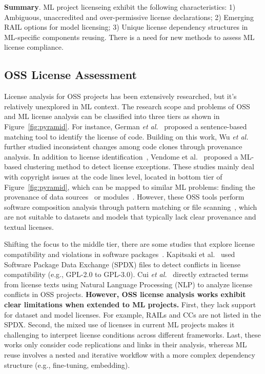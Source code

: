 \begin{tcolorbox}
\textbf{Summary}.
ML project licenseing exhibit the following characteristics:
1) Ambiguous, unaccredited and over-permissive license declarations;
2) Emerging RAIL options for model licensing;
3) Unique license dependency structures in ML-specific components reusing.
There is a need for new methods to assess ML license compliance.
\end{tcolorbox}



\subsection{OSS License Assessment}
License analysis for OSS projects has been extensively researched, but it's relatively unexplored in ML context.
The research scope and problems of OSS and ML license analysis can be classified into three tiers as shown in Figure~\ref{fig:pyramid}.
For instance, German \textit{et al.}~\cite{german2010sentence} proposed a sentence-based matching tool to identify the license of code.
Building on this work, Wu \textit{et al.}~\cite{wu2017analysis} further studied inconsistent changes among code clones through provenance analysis.
In addition to license identification~\cite{jaeger2017fossology}, Vendome et al.~\cite{vendome2017machine} proposed a ML-based clustering method to detect license exceptions.
These studies mainly deal with copyright issues at the code lines level, located in bottom tier of Figure~\ref{fig:pyramid}, which can be mapped to similar ML problems: finding the provenance of data sources~\cite{rajbahadur2021can} or modules~\cite{chen2022copy}.
However, these OSS tools perform software composition analysis through pattern matching or file scanning~\cite{ombredanne2020free}, which are not suitable to datasets and models that typically lack clear provenance and textual licenses.

Shifting the focus to the middle tier, there are some studies that explore license compatibility and violations in software packages~\cite{mathur2012empirical, wu2015method}. 
Kapitsaki et al.~\cite{kapitsaki2017automating} used Software Package Data Exchange (SPDX) files to detect conflicts in license compatibility (e.g., GPL-2.0 to GPL-3.0).
Cui \textit{et al.}~\cite{cui2023empirical} directly extracted terms from license texts using Natural Language Processing (NLP) to analyze license conflicts in OSS projects.
\textbf{However, OSS license analysis works exhibit clear limitations when extended to ML projects.}
First, they lack support for dataset and model licenses. For example, RAILs and CCs are not listed in the SPDX. 
Second, the mixed use of licenses in current ML projects makes it challenging to interpret license conditions across different frameworks.
Last, these works only consider code replications and links in their analysis, whereas ML reuse involves a nested and iterative workflow with a more complex dependency structure (e.g., fine-tuning, embedding).

